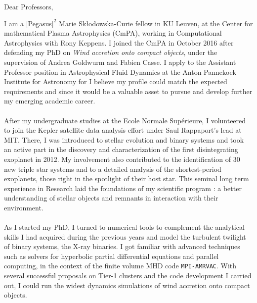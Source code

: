 \documentclass[12pt]{letter}
\begin{document}
 
 
\begin{letter} {}%
      


\date{20\textsuperscript{th} November, 2017}
\opening{Dear Professors,}
 
\thispagestyle{empty}
 
 

\hspace*{0.5cm} I am a $[$Pegasus$]^2$ Marie Sk\l{}odowska-Curie fellow in KU Leuven, at the Center for mathematical Plasma Astrophysics (CmPA), working in Computational Astrophysics with Rony Keppens. I joined the CmPA in October 2016 after defending my PhD on \textit{Wind accretion onto compact objects}, under the supervision of Andrea Goldwurm and Fabien Casse. I apply to the Assistant Professor position in Astrophysical Fluid Dynamics at the Anton Pannekoek Institute for Astronomy for I believe my profile could match the expected requirements and since it would be a valuable asset to pursue and develop further my emerging academic career. \\ \\
\hspace*{0.5cm} After my undergraduate studies at the Ecole Normale Sup\'erieure, I volunteered to join the Kepler satellite data analysis effort under Saul Rappaport's lead at MIT. There, I was introduced to stellar evolution and binary systems and took an active part in the discovery and characterization of the first disintegrating exoplanet in 2012. My involvement also contributed to the identification of 30 new triple star systems and to a detailed analysis of the shortest-period exoplanets, those right in the spotlight of their host star. This seminal long term experience in Research laid the foundations of my scientific program : a better understanding of stellar objects and remnants in interaction with their environment.\\ \\
\hspace*{0.5cm} As I started my PhD, I turned to numerical tools to complement the analytical skills I had acquired during the previous years and model the turbulent twilight of binary systems, the X-ray binaries. I got familiar with advanced techniques such as solvers for hyperbolic partial differential equations and parallel computing, in the context of the finite volume MHD code \texttt{MPI-AMRVAC}. With several successful proposals on Tier-1 clusters and the code development I carried out, I could run the widest dynamics simulations of wind accretion onto compact objects.\\


\end{letter}
\end{document}

